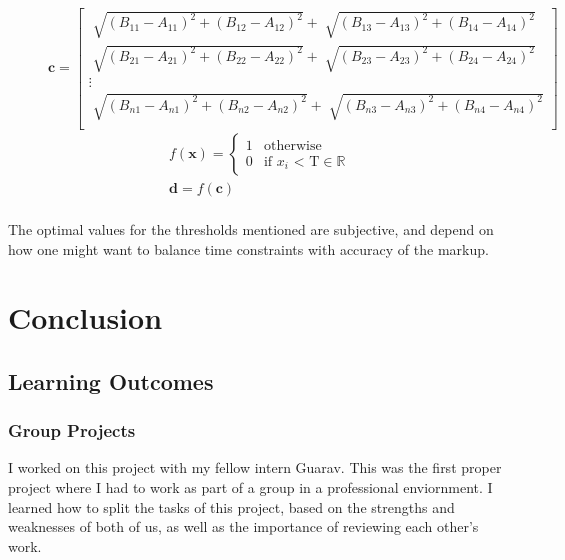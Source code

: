     \begin{figure}[h]
        \centering
        
        \[
        \pmb{c}=
        \begin{bmatrix}
            \sqrt[]{{(B_{11} - A_{11})}^2 + {(B_{12} - A_{12})}^2} + \sqrt[]{{(B_{13} - A_{13})}^2 + {(B_{14} - A_{14})}^2} \\
            \sqrt[]{{(B_{21} - A_{21})}^2 + {(B_{22} - A_{22})}^2} + \sqrt[]{{(B_{23} - A_{23})}^2 + {(B_{24} - A_{24})}^2} \\
            \vdots \\
            \sqrt[]{{(B_{n1} - A_{n1})}^2 + {(B_{n2} - A_{n2})}^2} + \sqrt[]{{(B_{n3} - A_{n3})}^2 + {(B_{n4} - A_{n4})}^2} \\
        \end{bmatrix}
        \]
        \begin{gather*}
            f(\pmb{x})=
        \begin{cases}
        1      & \text{otherwise}\\
        0      & \text{if $x_i$ < T} \in \mathbb{R} 
        \end{cases} \\
        \pmb{d} = f(\pmb{c}) \\
        \end{gather*}
        \caption{}
        \label{fig:roiprocessing}
    \end{figure} 

    The optimal values for the thresholds mentioned are subjective, and depend on how one might want to balance time constraints with accuracy of the markup.


\section{Conclusion}
    \subsection{Learning Outcomes}
        \subsubsection{Group Projects}
        I worked on this project with my fellow intern Guarav. This was the first proper project where I had to work as part of a group in a professional enviornment. I learned how to split the tasks of this project, based on the strengths and weaknesses of both of us, as well as the importance of reviewing each other's work.
